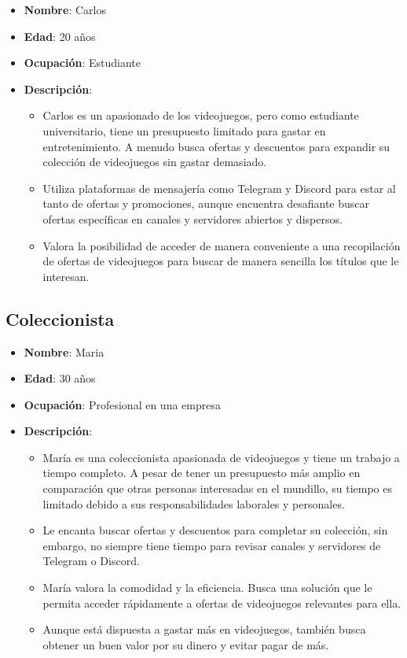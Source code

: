 \begin{itemize}
    \item \textbf{Nombre}: Carlos
    \item \textbf{Edad}: 20 años
    \item \textbf{Ocupación}: Estudiante
    \item \textbf{Descripción}:
    \begin{itemize}
        \item Carlos es un apasionado de los videojuegos, pero como estudiante 
        universitario, tiene un presupuesto limitado para gastar en 
        entretenimiento. A menudo busca ofertas y descuentos para expandir su 
        colección de videojuegos sin gastar demasiado.
        \item Utiliza plataformas de mensajería como Telegram y Discord para estar 
        al tanto de ofertas y promociones, aunque encuentra desafiante buscar 
        ofertas específicas en canales y servidores abiertos y dispersos.
        \item Valora la posibilidad de acceder de manera conveniente a una 
        recopilación de ofertas de videojuegos para buscar de manera sencilla los 
        títulos que le interesan.
    \end{itemize}
\end{itemize}

\subsection{Coleccionista}

\begin{itemize}
    \item \textbf{Nombre}: Maria
    \item \textbf{Edad}: 30 años
    \item \textbf{Ocupación}: Profesional en una empresa
    \item \textbf{Descripción}:
    \begin{itemize}
        \item María es una coleccionista apasionada de videojuegos y tiene un 
        trabajo a tiempo completo. A pesar de tener un presupuesto más amplio en 
        comparación que otras personas interesadas en el mundillo, su tiempo es 
        limitado debido a sus responsabilidades laborales y personales.
        \item Le encanta buscar ofertas y descuentos para completar su colección, 
        sin embargo, no siempre tiene tiempo para revisar canales y servidores de 
        Telegram o Discord.
        \item María valora la comodidad y la eficiencia. Busca una solución que le 
        permita acceder rápidamente a ofertas de videojuegos relevantes para ella.
        \item Aunque está dispuesta a gastar más en videojuegos, también busca 
        obtener un buen valor por su dinero y evitar pagar de más.
    \end{itemize}
\end{itemize}

